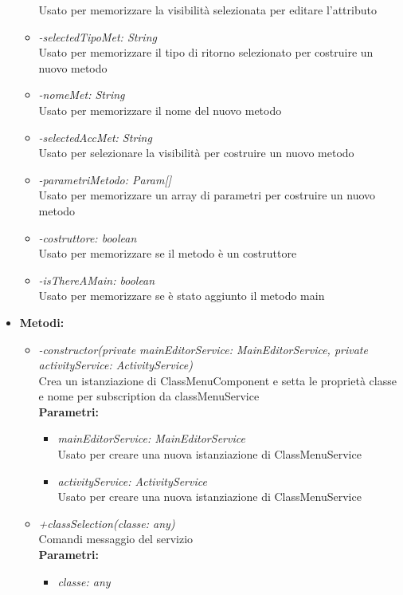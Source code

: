 \begin{itemize}
\begin{itemize}
			Usato per memorizzare la visibilità selezionata per editare l'attributo
			\item \emph{-selectedTipoMet: String}\\
			Usato per memorizzare il tipo di ritorno selezionato per costruire un nuovo metodo
			\item \emph{-nomeMet: String}\\
			Usato per memorizzare il nome del nuovo metodo
			\item \emph{-selectedAccMet: String}\\
			Usato per selezionare la visibilità per costruire un nuovo metodo
			\item \emph{-parametriMetodo: Param[]}\\
			Usato per memorizzare un array di parametri per costruire un nuovo metodo
			\item \emph{-costruttore: boolean}\\
			Usato per memorizzare se il metodo è un costruttore
			\item \emph{-isThereAMain: boolean}\\
			Usato per memorizzare se è stato aggiunto il metodo main
		\end{itemize}
	\item \textbf{Metodi:}
		\begin{itemize}
			\item \emph{-constructor(private mainEditorService: MainEditorService,
    private activityService: ActivityService)}\\
    		Crea un istanziazione di ClassMenuComponent e setta le proprietà classe e nome per subscription da classMenuService\\
    		\textbf{Parametri:}
    		\begin{itemize}
    			\item \emph{mainEditorService: MainEditorService}\\
    			Usato per creare una nuova istanziazione di ClassMenuService
    			\item \emph{activityService: ActivityService}\\
    			Usato per creare una nuova istanziazione di ClassMenuService
    		\end{itemize}
    		\item \emph{+classSelection(classe: any)}\\
    		Comandi messaggio del servizio\\
    		\textbf{Parametri:}
    		\begin{itemize}
    			\item \emph{classe: any}\\

\end{itemize}
\end{itemize}
\end{itemize}
